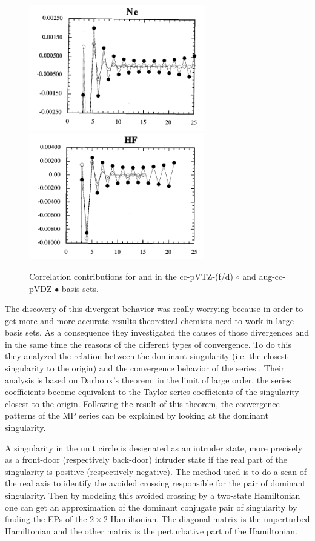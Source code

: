 \documentclass[11pt,a4paper]{article}
\begin{document}
\begin{figure}[h!]
    \includegraphics[height=5.5cm]{Nedivergence.png}
    \hfill
    \includegraphics[height=5.5cm]{HFdivergence.png}
    \hfill
    \caption{\centering Correlation contributions for  and  in the cc-pVTZ-(f/d) $\circ$ and aug-cc-pVDZ $\bullet$ basis sets.}
    \label{fig:my_label}
\end{figure}

The discovery of this divergent behavior was really worrying because in order to get more and more accurate results theoretical chemists need to work in large basis sets. As a consequence they investigated the causes of those divergences and in the same time the reasons of the different types of convergence. To do this they analyzed the relation between the dominant singularity (i.e. the closest singularity to the origin) and the convergence behavior of the series \cite{Olsen_2000}. Their analysis is based on Darboux's theorem: in the limit of large order, the series coefficients become equivalent to the Taylor series coefficients of the singularity closest to the origin. Following the result of this theorem, the convergence patterns of the MP series can be explained by looking at the dominant singularity.

A singularity in the unit circle is designated as an intruder state, more precisely as a front-door (respectively back-door) intruder state if the real part of the singularity is positive (respectively negative). The method used is to do a scan of the real axis to identify the avoided crossing responsible for the pair of dominant singularity. Then by modeling this avoided crossing by a two-state Hamiltonian one can get an approximation of the dominant conjugate pair of singularity by finding the EPs of the $2\times2$ Hamiltonian. The diagonal matrix is the unperturbed Hamiltonian and the other matrix is the perturbative part of the Hamiltonian.
\end{document}
